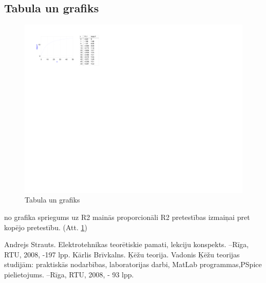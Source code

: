 \documentclass{report}
\begin{document}
\subsection{Tabula un grafiks}
\begin{figure}[!tb]
\includegraphics[width=\textwidth,height=\textheight,keepaspectratio]{IMAGES/02_tabula_grafiks.png}
\caption{Tabula un grafiks}
\label{Tabula un grafiks}
\end{figure}
no grafika spriegums uz R2 mainās proporcionāli R2 pretestības izmaiņai pret kopējo pretestību. (Att. \ref{Tabula un grafiks})
\begin{thebibliography}{9}
Andrejs Strauts. Elektrotehnikas teorētiskie pamati, lekciju konspekts. –Rīga,
RTU, 2008, -197 lpp.
Kārlis Brīvkalns. Ķēžu teorija. Vadonis Ķēžu teorijas studijām: praktiskās
nodarbības, laboratorijas darbi, MatLab programmas,PSpice pielietojums. –Rīga,
RTU, 2008, - 93 lpp.
\end{thebibliography}
\end{document}
